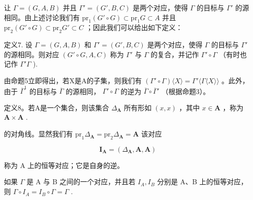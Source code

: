 让 \(\Gamma = (G, A, B)\) 并且 \(\Gamma' = (G', B, C)\) 是两个对应，使得 \(\Gamma\) 的目标与 \(\Gamma'\) 的源相同。由上述讨论我们有 \(\mathrm{pr}_1(G' \circ G) \subset \mathrm{pr}_1G \subset A\) 并且 \(\mathrm{pr}_2(G' \circ G) \subset \mathrm{pr}_2G' \subset C\) ；因此我们可以给出如下定义：

定义7. 设 \(\Gamma = (G, A, B)\) 和 \(\Gamma' = (G', B, C)\) 是两个对应，使得 \(\Gamma\) 的目标与 \(\Gamma'\) 的源相同。则对应 \((G' \circ G, A, C)\) 称为 \(\Gamma'\) 与 \(\Gamma\) 的复合，并记作 \(\Gamma' \circ \Gamma\) （有时也记作 \(\Gamma' \Gamma\) ).

由命题5立即得出，若X是A的子集，则我们有 \((\Gamma'\circ\Gamma)\langle X\rangle=\Gamma'\langle\Gamma\langle X\rangle\rangle\) 。此外，由于 \(\overline{\Gamma}^{1}\) 的目标与 \(\overline{\Gamma}\) 的源相同， \(\Gamma'\circ\Gamma\) 的逆为 \(\overline{\Gamma}\circ\overline{\Gamma}'\) （根据命题3）。

定义8。若A是一个集合，则该集合 \(\Delta_{\mathbf{A}}\) 所有形如 \((x, x)\) ，其中 \(x \in \mathbf{A}\) ，称为 \(\mathbf{A} \times \mathbf{A}\) .

的对角线。显然我们有 \(\mathrm{pr}_1\Delta_{\mathbf{A}} = \mathrm{pr}_2\Delta_{\mathbf{A}} = \mathbf{A}\) 该对应

\[
\mathbf {I} _ {\mathbf {A}} = (\Delta_ {\mathbf {A}}, \mathbf {A}, \mathbf {A})
\]

称为 A 上的恒等对应；它是自身的逆。

如果 \(\Gamma\) 是 A 与 B 之间的一个对应，并且若 \(I_{A}, I_{B}\) 分别是 A、B 上的恒等对应，则 \(\Gamma \circ I_{A} = I_{B} \circ \Gamma = \Gamma\) .

